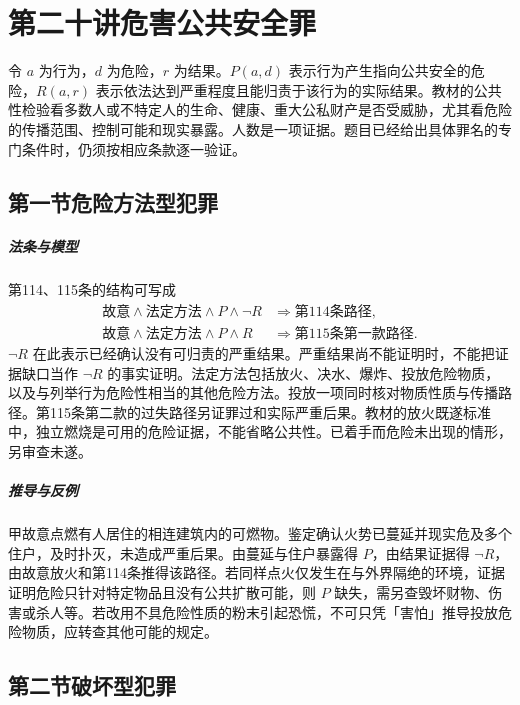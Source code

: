 \chapter{第二十讲\quad 危害公共安全罪}
\label{lecture:20}
\par

令 $a$ 为行为，$d$ 为危险，$r$ 为结果。$P(a,d)$ 表示行为产生指向公共安全的危险，$R(a,r)$ 表示依法达到严重程度且能归责于该行为的实际结果。教材的公共性检验看多数人或不特定人的生命、健康、重大公私财产是否受威胁，尤其看危险的传播范围、控制可能和现实暴露。人数是一项证据。题目已经给出具体罪名的专门条件时，仍须按相应条款逐一验证。

\section{第一节\quad 危险方法型犯罪}

\paragraph{法条与模型}
第114、115条的结构可写成
\[
\begin{aligned}
 \text{故意}\land\text{法定方法}\land P\land\neg R
    &\Longrightarrow \text{第114条路径},\\
 \text{故意}\land\text{法定方法}\land P\land R
    &\Longrightarrow \text{第115条第一款路径}.
\end{aligned}
\]
$\neg R$ 在此表示已经确认没有可归责的严重结果。严重结果尚不能证明时，不能把证据缺口当作 $\neg R$ 的事实证明。法定方法包括放火、决水、爆炸、投放危险物质，以及与列举行为危险性相当的其他危险方法。投放一项同时核对物质性质与传播路径。第115条第二款的过失路径另证罪过和实际严重后果。教材的放火既遂标准中，独立燃烧是可用的危险证据，不能省略公共性。已着手而危险未出现的情形，另审查未遂。

\paragraph{推导与反例}
甲故意点燃有人居住的相连建筑内的可燃物。鉴定确认火势已蔓延并现实危及多个住户，及时扑灭，未造成严重后果。由蔓延与住户暴露得 $P$，由结果证据得 $\neg R$，由故意放火和第114条推得该路径。若同样点火仅发生在与外界隔绝的环境，证据证明危险只针对特定物品且没有公共扩散可能，则 $P$ 缺失，需另查毁坏财物、伤害或杀人等。若改用不具危险性质的粉末引起恐慌，不可只凭「害怕」推导投放危险物质，应转查其他可能的规定。

\section{第二节\quad 破坏型犯罪}

